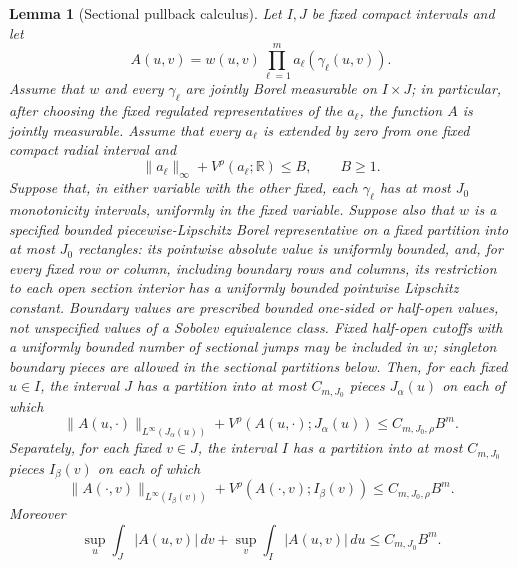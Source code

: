 \documentclass[11pt]{article}
\numberwithin{equation}{section}
\newtheorem{lemma}[theorem]{Lemma}
\theoremstyle{remark}
\theoremstyle{definition}
\begin{document}
\begin{lemma}[Sectional pullback calculus]
\label{lem:allq-sectional-calculus}
Let $I,J$ be fixed compact intervals and let
\[
 A(u,v)=w(u,v)\prod_{\ell=1}^m
 a_\ell(\gamma_\ell(u,v)).
\]
Assume that $w$ and every $\gamma_\ell$ are jointly Borel measurable on
$I\times J$; in particular, after choosing the fixed regulated
representatives of the $a_\ell$, the function $A$ is jointly measurable.
Assume that every $a_\ell$ is extended by zero from one fixed compact
radial interval and
\[
 \|a_\ell\|_\infty+V^\rho(a_\ell;\mathbb R)\le B,
 \qquad B\ge1.
\]
Suppose that, in either variable with the other fixed, each
$\gamma_\ell$ has at most $J_0$ monotonicity intervals, uniformly in the
fixed variable.  Suppose also that $w$ is a specified bounded piecewise-Lipschitz Borel
representative on a fixed partition into at most $J_0$ rectangles:
its pointwise absolute value is uniformly bounded, and, for every fixed
row or column, including boundary rows and columns, its restriction to
each open section interior has a uniformly bounded pointwise Lipschitz
constant.  Boundary values are prescribed bounded one-sided or half-open
values, not unspecified values of a Sobolev equivalence class.
Fixed half-open cutoffs with a uniformly bounded number of sectional
jumps may be included in $w$; singleton boundary pieces are allowed in
the sectional partitions below.  Then, for
each fixed $u\in I$, the interval $J$ has a partition into at most
$C_{m,J_0}$ pieces $J_\alpha(u)$ on each of which
\begin{equation}\label{eq:allq-sectional-calculus}
 \|A(u,\cdot)\|_{L^\infty(J_\alpha(u))}
 +V^\rho(A(u,\cdot);J_\alpha(u))
 \le C_{m,J_0,\rho}B^m.
\end{equation}
Separately, for each fixed $v\in J$, the interval $I$ has a partition
into at most $C_{m,J_0}$ pieces $I_\beta(v)$ on each of which
\[
 \|A(\cdot,v)\|_{L^\infty(I_\beta(v))}
 +V^\rho(A(\cdot,v);I_\beta(v))
 \le C_{m,J_0,\rho}B^m.
\]
Moreover
\begin{equation}\label{eq:allq-sectional-schur}
 \sup_u\int_J|A(u,v)|\,dv+
 \sup_v\int_I|A(u,v)|\,du
 \le C_{m,J_0}B^m.
\end{equation}
\end{lemma}
\end{document}
